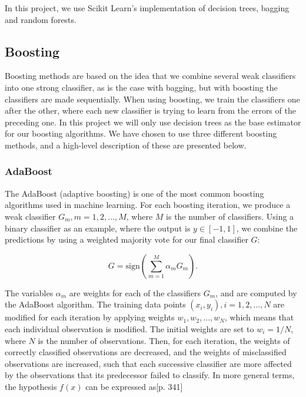 In this project, we use Scikit Learn's implementation of decision trees, bagging and random forests.


\subsection{Boosting}

Boosting methods are based on the idea that we combine several weak classifiers into one strong classifier, as is the case with bagging, but with boosting the classifiers are made sequentially. When using boosting, we train the classifiers one after the other, where each new classifier is trying to learn from the errors of the preceding one. In this project we will only use decision trees as the base estimator for our boosting algorithms. We have chosen to use three different boosting methods, and a high-level description of these are presented below.

\subsubsection{AdaBoost}

The AdaBoost (adaptive boosting) is one of the most common boosting algorithms used in machine learning. For each boosting iteration, we produce a weak classifier $G_m, m=1,2,...,M$, where $M$ is the number of classifiers. Using a binary classifier as an example, where the output is $y \in [-1, 1]$, we combine the predictions by using a weighted majority vote for our final classifier $G$\cite{hastie}:

\begin{equation}
    G = \text{sign} \left( \sum_{m=1}^M \alpha_m G_m \right).
    \label{eq:boosting}
\end{equation}

The variables $\alpha_m$ are weights for each of the classifiers $G_m$, and are computed by the AdaBoost algorithm. The training data points $(x_i, y_i), i=1,2,...,N$ are modified for each iteration by applying weights $w_1, w_2,...,w_N$, which means that each individual observation is modified. The initial weights are set to $w_i = 1/N$, where $N$ is the number of observations. Then, for each iteration, the weights of correctly classified observations are decreased, and the weights of misclassified observations are increased, such that each successive classifier are more affected by the observations that its predecessor failed to classify. In more general terms, the hypothesis $f(x)$ can be expressed as\cite{hastie}[p. 341]

